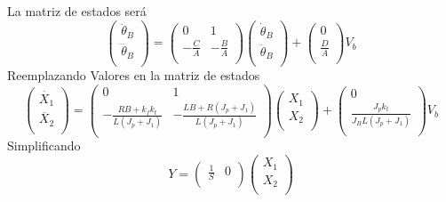 \documentclass[a4paper]{IEEEtran} %
\begin{document}
La matriz de estados será
\begin{equation}
    \begin{pmatrix}
        \ddot{\theta}_{B}\\
        \dddot{\theta}_{B}\\
    \end{pmatrix}
    =
    \begin{pmatrix}
    0&1\\
    -\frac{C}{A}&-\frac{B}{A}\\
    \end{pmatrix}
    \begin{pmatrix}
        \dot{\theta}_{B}\\
        \ddot{\theta}_{B}\\
    \end{pmatrix}
    +
    \begin{pmatrix}
        0\\
        \frac{D}{A}\\
    \end{pmatrix}
    V_{b}
    \label{eq:scattering}
\end{equation}
Reemplazando Valores en la matriz de estados
\begin{equation}
    \begin{pmatrix}
        \dot{X_{1}}\\
        \ddot{X_{2}}\\
    \end{pmatrix}
    =
    \begin{pmatrix}
    0&1\\
    -\frac{RB+k_{f}k_{t}}{L(J_{p}+J_{1})}&-\frac{LB+R(J_{p}+J_{1})}{L(J_{p}+J_{1})}\\
    \end{pmatrix}
    \begin{pmatrix}
        X_{1}\\
        X_{2}\\
    \end{pmatrix}
    +
    \begin{pmatrix}
        0\\
        \frac{J_{p}k_{t}}{J_{B}L(J_{p}+J_{1})}\\
    \end{pmatrix}
    V_{b}
    \label{eq:scattering}
\end{equation}
Simplificando
\begin{equation}
    Y=
    \begin{pmatrix}
        \frac{1}{S}&0\\
    \end{pmatrix}
    \begin{pmatrix}
        X_{1}\\
        X_{2}\\
    \end{pmatrix}
    \label{eq:scattering}
\end{equation}


\end{document}
